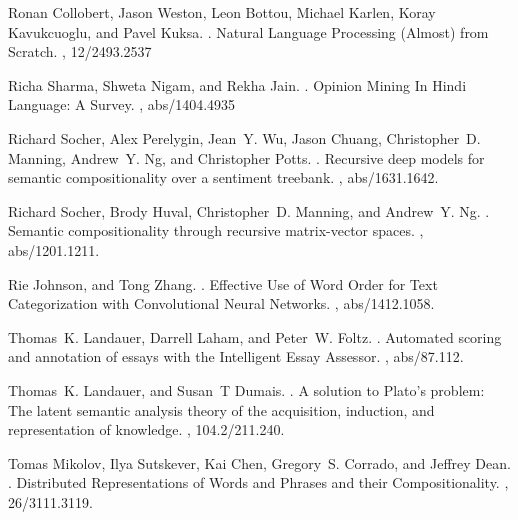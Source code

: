 \def\DevnagVersion{2.15}\documentclass[11pt]{article}
\begin{document}
\begin{thebibliography}{40}
Ronan Collobert, Jason Weston, Leon Bottou, Michael Karlen, Koray Kavukcuoglu, and Pavel Kuksa.
.
\newblock Natural Language Processing (Almost) from Scratch.
,
   12/2493.2537

Richa Sharma, Shweta Nigam, and Rekha Jain.
.
\newblock Opinion Mining In Hindi Language: A Survey.
,
   abs/1404.4935
   
Richard Socher, Alex Perelygin, Jean~Y. Wu, Jason Chuang, Christopher~D. Manning, Andrew~Y. Ng, and Christopher Potts.
.
\newblock Recursive deep models for semantic compositionality over a sentiment treebank.
,
  abs/1631.1642.
  
Richard Socher, Brody Huval, Christopher~D. Manning, and Andrew~Y. Ng.
.
\newblock Semantic compositionality through recursive matrix-vector spaces.
,
  abs/1201.1211.


Rie Johnson, and Tong Zhang.
.
\newblock Effective Use of Word Order for Text Categorization with Convolutional Neural Networks.
,
  abs/1412.1058.

Thomas~K. Landauer, Darrell Laham, and Peter~W. Foltz.
.
\newblock Automated scoring and annotation of essays with the Intelligent Essay Assessor.
,
  abs/87.112.

Thomas~K. Landauer, and Susan~T Dumais.
.
\newblock A solution to Plato's problem: The latent semantic analysis theory of the acquisition, induction, and representation of knowledge.
,
  104.2/211.240.

Tomas Mikolov, Ilya Sutskever, Kai Chen, Gregory~S. Corrado, and Jeffrey Dean.
.
\newblock Distributed Representations of Words and Phrases and their Compositionality.
,
  26/3111.3119.


\end{thebibliography}
\end{document}
